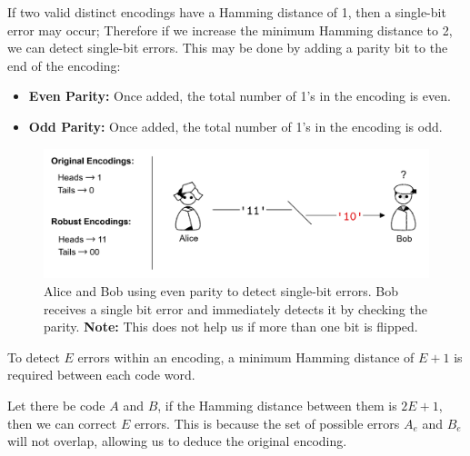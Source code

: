 \newpage 

\noindent
\begin{Def}

    If two valid distinct encodings have a Hamming distance of 1, then a single-bit error may occur;
    Therefore if we increase the minimum Hamming distance to 2, we can detect single-bit errors. 
    This may be done by adding a parity bit to the end of the encoding:
    \begin{itemize}
        \item \textbf{Even Parity:} Once added, the total number of 1's in the encoding is even.
        \item \textbf{Odd Parity:} Once added, the total number of 1's in the encoding is odd.
    \end{itemize}

\end{Def}

\begin{figure}[ht!]
    \centering
    \includegraphics[width=\textwidth]{./Sections/comp/info_effic/parity.png}
    \caption{Alice and Bob using even parity to detect single-bit errors. Bob receives a single bit error and immediately detects it
    by checking the parity. \textbf{Note:} This does not help us if more than one bit is flipped.}
    \label{fig:parity}
\end{figure}

\begin{theo}

    \label{theo:multi_bit_error_detection}  


    To detect $E$ errors within an encoding, a minimum Hamming distance of $E+1$ is required 
    between each code word. 
\end{theo}

\begin{theo}

    \label{theo:error_correction}

    Let there be code $A$ and $B$, if the Hamming distance between them is $2E+1$, then we can correct $E$ errors.
    This is because the set of possible errors $A_e$ and $B_e$ will not overlap, allowing us to deduce the original encoding.
\end{theo}